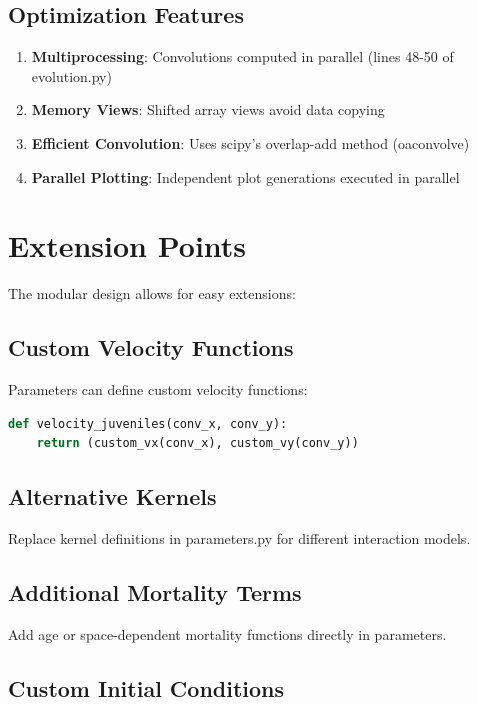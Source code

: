 \documentclass[12pt,a4paper]{report}
\begin{document}
\section{Optimization Features}

\begin{enumerate}
    \item \textbf{Multiprocessing}: Convolutions computed in parallel (lines 48-50 of evolution.py)
    \item \textbf{Memory Views}: Shifted array views avoid data copying
    \item \textbf{Efficient Convolution}: Uses scipy's overlap-add method (oaconvolve)
    \item \textbf{Parallel Plotting}: Independent plot generations executed in parallel
\end{enumerate}

\chapter{Extension Points}

The modular design allows for easy extensions:

\section{Custom Velocity Functions}

Parameters can define custom velocity functions:

\begin{lstlisting}[language=Python]
def velocity_juveniles(conv_x, conv_y):
    return (custom_vx(conv_x), custom_vy(conv_y))
\end{lstlisting}

\section{Alternative Kernels}

Replace kernel definitions in parameters.py for different interaction models.

\section{Additional Mortality Terms}

Add age or space-dependent mortality functions directly in parameters.

\section{Custom Initial Conditions}
\end{document}
